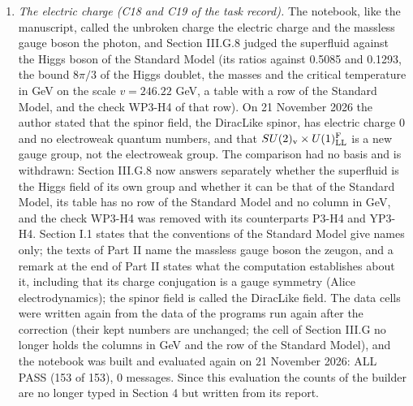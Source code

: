 \documentclass[
  10pt,
]{article}
\begin{document}
\begin{enumerate}
  \(ZZ\), not that of the sum over the polarizations. It was found on 21
  November 2026, when the numbers typed in the drafts of the article for
  Physical Review D were compared with the data; the same sentence stood
  in Section 14.6 of the manuscript and in the addendum A2 of
  \texttt{provenance/P4\_remarks.md}, which were corrected first.
  Section III.G.8 now explains the corrections at tree level, with the
  factor as a formula, and a new input cell (\texttt{gzVV}) computes for
  every method the larger ratio of the masses, the smaller factor and
  how much the masses of the effective Lagrangian exceed those of the
  linear response. The cell makes no check: its numbers come from the
  values of the Rust program that the checks WP3-H1 to WP3-H3 have
  already compared with the notebook's own.
\item
  \emph{The electric charge (C18 and C19 of the task record).} The
  notebook, like the manuscript, called the unbroken charge the electric
  charge and the massless gauge boson the photon, and Section III.G.8
  judged the superfluid against the Higgs boson of the Standard Model
  (its ratios against 0.5085 and 0.1293, the bound \(8\pi/3\) of the
  Higgs doublet, the masses and the critical temperature in GeV on the
  scale \(v=246.22\) GeV, a table with a row of the Standard Model, and
  the check WP3-H4 of that row). On 21 November 2026 the author stated
  that the spinor field, the DiracLike spinor, has electric charge 0 and
  no electroweak quantum numbers, and that
  \(SU(2)_{\rm v}\times U(1)^{\rm F}_{\rm LL}\) is a new gauge group,
  not the electroweak group. The comparison had no basis and is
  withdrawn: Section III.G.8 now answers separately whether the
  superfluid is the Higgs field of its own group and whether it can be
  that of the Standard Model, its table has no row of the Standard Model
  and no column in GeV, and the check WP3-H4 was removed with its
  counterparts P3-H4 and YP3-H4. Section I.1 states that the conventions
  of the Standard Model give names only; the texts of Part II name the
  massless gauge boson the zeugon, and a remark at the end of Part II
  states what the computation establishes about it, including that its
  charge conjugation is a gauge symmetry (Alice electrodynamics); the
  spinor field is called the DiracLike field. The data cells were
  written again from the data of the programs run again after the
  correction (their kept numbers are unchanged; the cell of Section
  III.G no longer holds the columns in GeV and the row of the Standard
  Model), and the notebook was built and evaluated again on 21 November
  2026: ALL PASS (153 of 153), 0 messages. Since this evaluation the
  counts of the builder are no longer typed in Section 4 but written
  from its report.
\end{enumerate}
\end{document}
